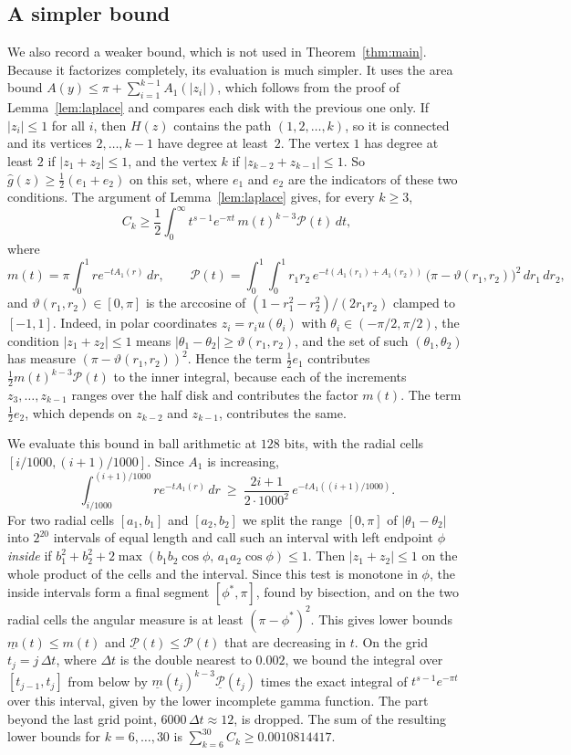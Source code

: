 \documentclass[11pt]{amsart}
\theoremstyle{definition}
\theoremstyle{remark}
\numberwithin{equation}{section}
\newcommand{\LevelZero}{0.0010814417}
\begin{document}
\subsection{A simpler bound}\label{sec:level0}
We also record a weaker bound, which is not used in Theorem~\ref{thm:main}. Because it factorizes completely, its evaluation is much simpler. It uses the area bound $A(y)\le\pi+\sum_{i=1}^{k-1}A_1(|z_i|)$, which follows from the proof of Lemma~\ref{lem:laplace} and compares each disk with the previous one only. If $|z_i|\le1$ for all $i$, then $H(z)$ contains the path $(1,2,\dots,k)$, so it is connected and its vertices $2,\dots,k-1$ have degree at least~$2$. The vertex $1$ has degree at least $2$ if $|z_1+z_2|\le1$, and the vertex $k$ if $|z_{k-2}+z_{k-1}|\le1$. So $\hat g(z)\ge\frac12(e_1+e_2)$ on this set, where $e_1$ and $e_2$ are the indicators of these two conditions. The argument of Lemma~\ref{lem:laplace} gives, for every $k\ge3$,
\[
C_k\ge\frac12\int_0^\infty t^{s-1}e^{-\pi t}\,m(t)^{k-3}\mathcal P(t)\,dt,
\]
where
\[
m(t)=\pi\int_0^1re^{-tA_1(r)}\,dr,\qquad\mathcal P(t)=\int_0^1\!\!\int_0^1r_1r_2\,e^{-t(A_1(r_1)+A_1(r_2))}\,\bigl(\pi-\vartheta(r_1,r_2)\bigr)^2\,dr_1\,dr_2,
\]
and $\vartheta(r_1,r_2)\in[0,\pi]$ is the arccosine of $(1-r_1^2-r_2^2)/(2r_1r_2)$ clamped to $[-1,1]$. Indeed, in polar coordinates $z_i=r_iu(\theta_i)$ with $\theta_i\in(-\pi/2,\pi/2)$, the condition $|z_1+z_2|\le1$ means $|\theta_1-\theta_2|\ge\vartheta(r_1,r_2)$, and the set of such $(\theta_1,\theta_2)$ has measure $(\pi-\vartheta(r_1,r_2))^2$. Hence the term $\frac12e_1$ contributes $\frac12m(t)^{k-3}\mathcal P(t)$ to the inner integral, because each of the increments $z_3,\dots,z_{k-1}$ ranges over the half disk and contributes the factor $m(t)$. The term $\frac12e_2$, which depends on $z_{k-2}$ and $z_{k-1}$, contributes the same.

We evaluate this bound in ball arithmetic at $128$ bits, with the radial cells $[i/1000,(i+1)/1000]$. Since $A_1$ is increasing,
\[
\int_{i/1000}^{(i+1)/1000}re^{-tA_1(r)}\,dr\ \ge\ \frac{2i+1}{2\cdot1000^2}\,e^{-tA_1((i+1)/1000)}.
\]
For two radial cells $[a_1,b_1]$ and $[a_2,b_2]$ we split the range $[0,\pi]$ of $|\theta_1-\theta_2|$ into $2^{20}$ intervals of equal length and call such an interval with left endpoint $\phi$ \emph{inside} if $b_1^2+b_2^2+2\max(b_1b_2\cos\phi,\,a_1a_2\cos\phi)\le1$. Then $|z_1+z_2|\le1$ on the whole product of the cells and the interval. Since this test is monotone in $\phi$, the inside intervals form a final segment $[\phi^*,\pi]$, found by bisection, and on the two radial cells the angular measure is at least $(\pi-\phi^*)^2$. This gives lower bounds $\underline m(t)\le m(t)$ and $\underline{\mathcal P}(t)\le\mathcal P(t)$ that are decreasing in $t$. On the grid $t_j=j\,\Delta t$, where $\Delta t$ is the double nearest to $0.002$, we bound the integral over $[t_{j-1},t_j]$ from below by $\underline m(t_j)^{k-3}\underline{\mathcal P}(t_j)$ times the exact integral of $t^{s-1}e^{-\pi t}$ over this interval, given by the lower incomplete gamma function. The part beyond the last grid point, $6000\,\Delta t\approx12$, is dropped. The sum of the resulting lower bounds for $k=6,\dots,30$ is $\sum_{k=6}^{30}C_k\ge\LevelZero$.
\end{document}

